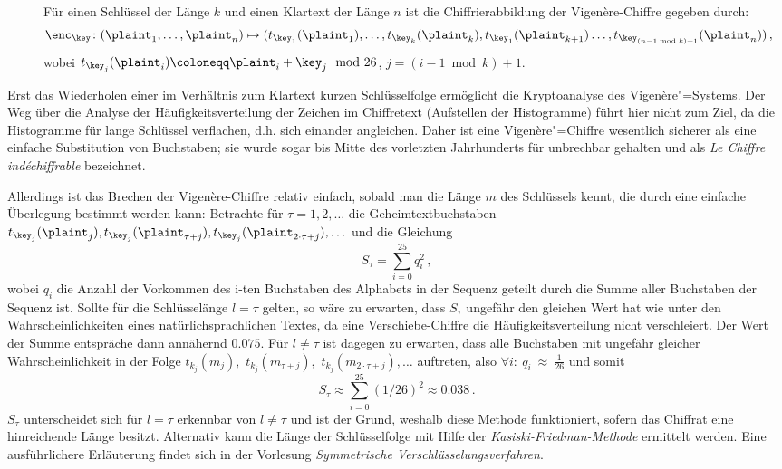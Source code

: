 \begin{figure}[h]
	Für einen Schlüssel der Länge $k$  und einen Klartext der Länge $n$ ist die Chiffrierabbildung der Vigenère-Chiffre gegeben durch:
	\begin{align*}
		\enc_{\key}\colon (\plaint_1,\ldots,\plaint_{n}) \mapsto (t_{\key_1}(\plaint_1),\ldots,t_{\key_{k}}(\plaint_{k}),t_{\key_1}(\plaint_{k+1})\ldots,t_{\key_{(n-1 \bmod k)+1}}(\plaint_{n}))\, ,
	\end{align*}
	wobei $t_{\key_{j}}(\plaint_{i}) \coloneqq \plaint_{i} + \key_{j} \mod 26$, $j = (i-1 \bmod k)+1$.
\end{figure}
Erst das Wiederholen einer im Verhältnis zum Klartext kurzen Schlüsselfolge ermöglicht die Kryptoanalyse des Vigenère"=Systems.
Der Weg über die Analyse der Häufigkeitsverteilung der Zeichen im Chiffretext (Aufstellen der Histogramme) führt hier nicht zum Ziel, da die Histogramme für
lange Schlüssel verflachen, d.h. sich einander angleichen. Daher ist eine Vigenère"=Chiffre wesentlich sicherer als eine einfache Substitution von
Buchstaben; sie wurde sogar bis Mitte des vorletzten Jahrhunderts für unbrechbar gehalten und als \emph{Le Chiffre indéchiffrable} bezeichnet.

Allerdings ist das Brechen der Vigenère-Chiffre relativ einfach, sobald man die Länge $m$ des Schlüssels kennt, die durch eine einfache Überlegung bestimmt werden kann: Betrachte für $\tau = 1,2,\ldots$ die Geheimtextbuchstaben $t_{\key_j}(\plaint_j),t_{\key_j}(\plaint_{\tau+j}),t_{\key_j}(\plaint_{2 \cdot \tau+j}),\ldots$ und die Gleichung
\begin{equation*}
	S_{\tau}=	\sum_{i=0}^{25} q^2_i \, ,
\end{equation*}
wobei $q_i$ die Anzahl der Vorkommen des i-ten Buchstaben des Alphabets in der Sequenz geteilt durch die Summe aller Buchstaben der Sequenz ist. Sollte für die
Schlüsselänge $l = \tau$ gelten, so wäre zu erwarten, dass $S_{\tau}$ ungefähr den gleichen Wert hat wie unter den Wahrscheinlichkeiten eines
natürlichsprachlichen Textes, da eine Verschiebe-Chiffre die Häufigkeitsverteilung nicht verschleiert. Der Wert der Summe entspräche dann annähernd $0.075$.
Für $l \neq \tau$ ist dagegen zu erwarten, dass alle Buchstaben mit ungefähr gleicher Wahrscheinlichkeit in der Folge $t_{k_j}(m_j),$ $t_{k_j}(m_{\tau+j}),$ $t_{k_j}(m_{2 \cdot \tau+j}),\ldots$ auftreten, also $\forall i\colon~q_i~\approx~\frac{1}{26}$ und somit
\begin{equation*}
	S_{\tau} \approx \sum_{i=0}^{25} (1/26)^2 \approx 0.038 \,\text{.}
\end{equation*}
$S_{\tau}$ unterscheidet sich für $l = \tau$ erkennbar von $l \neq \tau$
und ist der Grund, weshalb diese Methode funktioniert, sofern das
Chiffrat eine hinreichende Länge besitzt. Alternativ kann die Länge der
Schlüsselfolge mit Hilfe der \emph{Kasiski-Friedman-Methode}
\cite{Kasiski1863} ermittelt werden. Eine ausführlichere Erläuterung
findet sich in der Vorlesung \emph{Symmetrische Verschlüsselungsverfahren}\cite{Geiselmann2016}.

